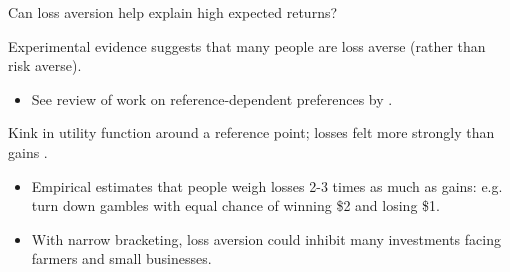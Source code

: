\documentclass[aspectratio=169, 10pt, handout]{beamer}
\newenvironment{wideitemize}{\itemize\addtolength{\itemsep}{10pt}}{\enditemize}
\begin{document}
\begin{frame}{Can loss aversion help explain high expected returns?}

\begin{wideitemize}

	\item Experimental evidence suggests that many people are loss averse (rather than risk averse). 
	
	\begin{itemize}

	    \item See review of work on reference-dependent preferences by \cite{o1999doing}.
 
	\end{itemize}
	

	\item Kink in utility function around a reference point; losses felt more strongly than gains \citep{kahneman47l979}.

	\begin{itemize}
	
		\item Empirical estimates that people weigh losses 2-3 times as much as gains: e.g. turn down gambles with equal chance of winning \$2 and losing \$1.
		
		\item With narrow bracketing, loss aversion could inhibit many investments facing farmers and small businesses.

	\end{itemize}

\end{wideitemize}

\end{frame}
\end{document}
